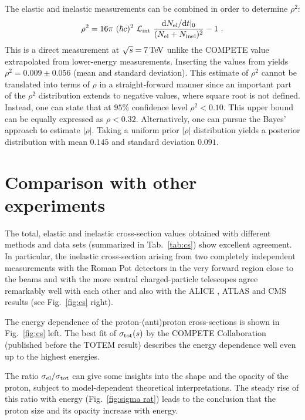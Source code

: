\documentclass[doublecol]{epl/epl2}
\def\d{{\rm d}}
\def\un#1{\,{\rm #1}}
\begin{document}
The elastic and inelastic measurements can be combined in order to determine $\rho^2$:
\begin{equation}
\label{eq:rho}
\rho^2 = 16\pi\ (\hbar c)^2\ {\cal L_{\rm int}}\ {\d N_{\rm el}/\d t|_0\over (N_{\rm el} + N_{\rm inel})^2} - 1\ .
\end{equation}
This is a direct measurement at $\sqrt s = 7\un{TeV}$ unlike the COMPETE value extrapolated from lower-energy measurements. Inserting the values from \cite{P1,P2} yields $\rho^2 = 0.009 \pm 0.056$ (mean and standard deviation). This estimate of $\rho^2$ cannot be translated into terms of $\rho$ in a straight-forward manner since an important part of the $\rho^2$ distribution extends to negative values, where square root is not defined. Instead, one can state that at $95\%$ confidence level $\rho^2 < 0.10$. This upper bound can be equally expressed as $\rho < 0.32$. Alternatively, one can pursue the Bayes' approach to estimate $|\rho|$. Taking a uniform prior $|\rho|$ distribution yields a posterior distribution with mean $0.145$ and standard deviation $0.091$.

\section{Comparison with other experiments}

The total, elastic and inelastic cross-section values obtained with different methods and data sets (summarized in Tab.~\ref{tab:cs}) show excellent agreement. In particular, the inelastic cross-section arising from two completely independent measurements with the Roman Pot detectors in the very forward region close to the beams and with the more central charged-particle telescopes agree remarkably well with each other and also with the ALICE \cite{alice_inel}, ATLAS \cite{atlas_inel} and CMS \cite{cms_inel} results (see Fig.~\ref{fig:cs} right).

The energy dependence of the proton-(anti)proton cross-sections is shown in Fig.~\ref{fig:cs} left. The best fit of $\sigma_{\rm tot}(s)$ by the COMPETE Collaboration \cite{compete} (published before the TOTEM result) describes the energy dependence well even up to the highest energies.  

The ratio $\sigma_{\rm el}/\sigma_{\rm tot}$ can give some insights into the shape and the opacity of the proton, subject to model-dependent theoretical interpretations. The steady rise of this ratio with energy (Fig.~\ref{fig:sigma rat}) leads to the conclusion that the proton size and its opacity increase with energy. 
\end{document}
